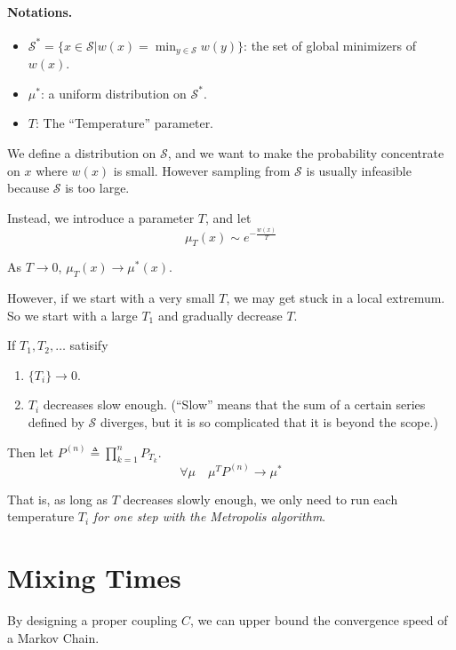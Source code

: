         \paragraph{Notations.}
        \begin{itemize}
            \item $\mathcal{S}^* = \{x\in\mathcal{S}|w(x) = \min_{y\in\mathcal{S}} w(y)\}$: the set of global minimizers of $w(x)$.
            \item $\mu^*$: a uniform distribution on $\mathcal{S}^*$.
            \item $T$: The ``Temperature'' parameter.
        \end{itemize}
        \par We define a distribution on $\mathcal{S}$, and we want to make the probability concentrate on $x$ where $w(x)$ is small. However sampling from $\mathcal{S}$ is usually infeasible because $\mathcal{S}$ is too large.
        \par Instead, we introduce a parameter $T$, and let
        \[ \mu_T(x) \sim e^{-\frac{w(x)}{T}} \]
        \begin{proposition}
            As $T \to 0$, $\mu_T(x) \to \mu^*(x)$.
        \end{proposition}
        \par However, if we start with a very small $T$, we may get stuck in a local extremum. So we start with a large $T_1$ and gradually decrease $T$.
        \begin{theorem}
            If $T_1,T_2,\dots$ satisify
            \begin{enumerate}
                \item $\{T_i\} \to 0$.
                \item $T_i$ decreases slow enough. (``Slow'' means that the sum of a certain series defined by $\mathcal{S}$ diverges, but it is so complicated that it is beyond the scope.)
            \end{enumerate}
            Then let $P^{(n)} \triangleq \prod_{k=1}^n P_{T_k}$.
            \[ \forall \mu \quad \mu^TP^{(n)} \to \mu^* \]
        \end{theorem}
        That is, as long as $T$ decreases slowly enough, we only need to run each temperature $T_i$ \emph{for one step with the Metropolis algorithm}.


\section{Mixing Times}
    By designing a proper coupling $C$, we can upper bound the convergence speed of a Markov Chain.

